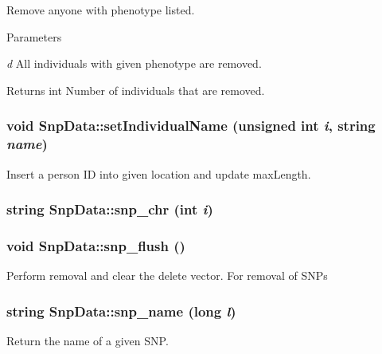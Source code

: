 Remove anyone with phenotype listed. 
\begin{DoxyParams}{Parameters}
\item[{\em d}]All individuals with given phenotype are removed. \end{DoxyParams}
\begin{DoxyReturn}{Returns}
int Number of individuals that are removed. 
\end{DoxyReturn}
\hypertarget{classSnpData_a7154ea651a58dc4d2fa5398acfa85780}{
\subsubsection[{setIndividualName}]{\setlength{\rightskip}{0pt plus 5cm}void SnpData::setIndividualName (unsigned int {\em i}, \/  string {\em name})}}
\label{classSnpData_a7154ea651a58dc4d2fa5398acfa85780}
Insert a person ID into given location and update maxLength. \hypertarget{classSnpData_aa4fa47c8134b674769f5638074ae46f8}{
\subsubsection[{snp\_\-chr}]{\setlength{\rightskip}{0pt plus 5cm}string SnpData::snp\_\-chr (int {\em i})}}
\label{classSnpData_aa4fa47c8134b674769f5638074ae46f8}
\hypertarget{classSnpData_afc11539758009ab2d5cd4f2b04f7c1bd}{
\subsubsection[{snp\_\-flush}]{\setlength{\rightskip}{0pt plus 5cm}void SnpData::snp\_\-flush ()}}
\label{classSnpData_afc11539758009ab2d5cd4f2b04f7c1bd}
Perform removal and clear the delete vector. For removal of SNPs \hypertarget{classSnpData_a5a23514541160563ae68bf2b5a0e2355}{
\subsubsection[{snp\_\-name}]{\setlength{\rightskip}{0pt plus 5cm}string SnpData::snp\_\-name (long {\em l})}}
\label{classSnpData_a5a23514541160563ae68bf2b5a0e2355}
Return the name of a given SNP.



